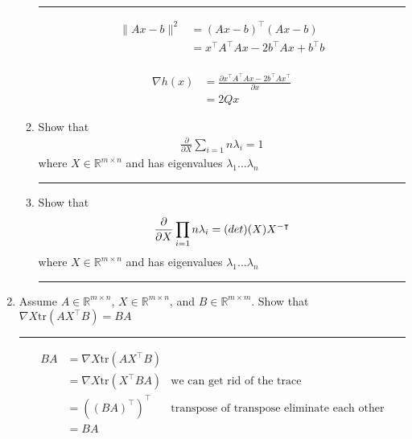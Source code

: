 \documentclass[12pt]{article}
\begin{document}
\begin{enumerate}
\begin{enumerate}
        \noindent\rule{\linewidth}{1pt}

        \begin{align*}
            \lVert Ax - b \rVert ^2 &= (Ax - b)^\intercal (Ax - b) \\
            &= x^\intercal A^\intercal Ax-2b^\intercal Ax+b^\intercal b \\
        \end{align*}

        \begin{align*}
            \nabla h(x) &= \frac{\partial x^\intercal A^\intercal Ax-2b^\intercal Ax^\intercal}{\partial x} \\
                        &= 2Qx
        \end{align*}
        
        \item Show that
        \begin{align*}
            \frac{\partial}{\partial X} \sum_{i=1}{n} \lambda_i = 1
        \end{align*}
        where $X \in \mathbb{R}^{m \times n}$ and has eigenvalues $\lambda_1 \dots \lambda_n$

        \noindent\rule{\linewidth}{1pt}

        \item Show that
        \begin{align*}
            \frac{\partial}{\partial X} \prod_{i=1}{n} \lambda_i = \textrm(det)(X)X^{-\intercal}
        \end{align*}
        where $X \in \mathbb{R}^{m \times n}$ and has eigenvalues $\lambda_1 \dots \lambda_n$

        \noindent\rule{\linewidth}{1pt}


    \end{enumerate}   
    
    \item Assume $A \in \mathbb{R}^{m \times n} $, $X \in \mathbb{R}^{m \times n} $, and $B \in \mathbb{R}^{m \times m} $. Show that $\nabla X \textrm{tr}(AX^\intercal B) = BA$
    
    \noindent\rule{\linewidth}{1pt}
    \begin{align*}
        BA &= \nabla X \textrm{tr}(AX^\intercal B) \\
           &= \nabla X \textrm{tr}(X^\intercal BA) & \textrm{we can get rid of the trace}\\
           &= ((BA)^\intercal )^\intercal  & \textrm{transpose of transpose eliminate each other}\\
           &= BA
    \end{align*}


\end{enumerate}
\end{document}
